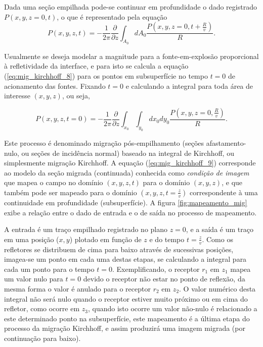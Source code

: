 Dada uma seção empilhada pode-se continuar em profundidade o dado registrado $P(x,y,z=0,t)$, o que é representado pela equação
\begin{equation}
P(x,y,z,t)=-\frac{1}{2\pi}\frac{\partial}{\partial z}\int_{A_0}dA_0\frac{P(x,y,z=0,t+\frac{R}{v})}{R}. 
\label{eq:mig_kirchhoff_8}
\end{equation}

Usualmente se deseja modelar a magnitude para a fonte-em-explosão proporcional à refletividade da interface, e para isto se calcula a equação (\ref{eq:mig_kirchhoff_8}) para os pontos em subsuperfície no tempo $t=0$ de acionamento das fontes. 
Fixando $t=0$ e calculando a integral para toda área de interesse $(x,y,z)$, ou seja,

\begin{equation}
P(x,y,z,t=0)=-\frac{1}{2\pi}\frac{\partial}{\partial z}\int_{x_0}\int_{y_0}dx_0 dy_0\frac{P(x,y,z=0,\frac{R}{v})}{R}.
\label{eq:mig_kirchhoff_9}
\end{equation}


Este processo é denominado migração pós-empilhamento (seções afastamento-nulo, ou seções de incidência normal) baseado na integral de Kirchhoff, ou simplesmente migração Kirchhoff.
A equação (\ref{eq:mig_kirchhoff_9}) corresponde ao modelo da seção migrada (continuada) conhecida como \textit{condição de imagem} que mapea o campo no domínio $(x,y,z,t)$ para o domínio $(x,y,z)$, e que também pode ser mapeado para o domínio $(x,y,z,t=\frac{z}{v})$ correspondente à uma continuidade em profundidade (subsuperfície).
A figura \ref{fig:mapeamento_mig} exibe a relação entre o dado de entrada e o de saída no processo de mapeamento.

A entrada é um traço empilhado registrado no plano $z=0$, e a saída é um traço em uma posição ($x,y$) plotado em função de $z$ e do tempo $t=\frac{z}{v}$. 
Como os refletores se distribuem de cima para baixo através de sucessivas posições, imagea-se um ponto em cada uma destas etapas, se calculando a integral para cada um ponto para o tempo $t=0$. 
Exemplificando, o receptor $r_1$ em $z_1$ mapea um valor nulo para $t=0$ devido o receptor não estar no ponto de reflexão, da mesma forma o valor é anulado para o receptor $r_2$ em $z_2$. O valor numérico desta integral não será nulo quando o receptor estiver muito próximo ou em cima do refletor, como ocorre em $z_3$, quando isto ocorre um valor não-nulo é relacionado a este determinado ponto na subsuperfície, este mapeamento é a última etapa do processo da migração Kirchhoff, e assim produzirá uma imagem migrada (por continuação para baixo).

